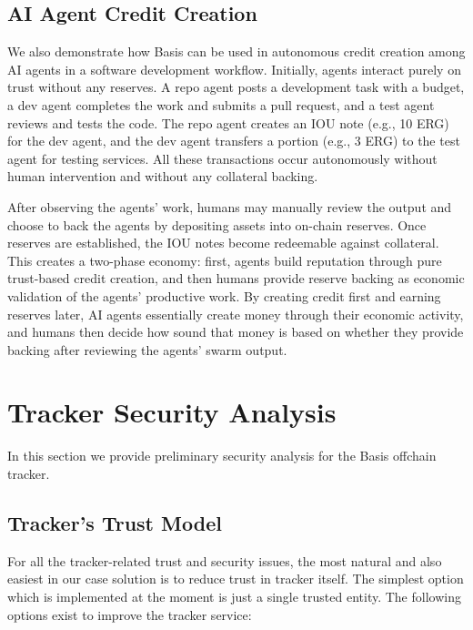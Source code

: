 \documentclass{ifcolog}
\newcommand{\basis}{Basis}
\begin{document}
\subsection{AI Agent Credit Creation}

We also demonstrate how \basis{} can be used in autonomous credit creation among AI agents in a software development workflow. Initially, agents interact purely on trust without any reserves. A repo agent posts a development task with a budget, a dev agent completes the work and submits a pull request, and a test agent reviews and tests the code. The repo agent creates an IOU note (e.g., 10 ERG) for the dev agent, and the dev agent transfers a portion (e.g., 3 ERG) to the test agent for testing services. All these transactions occur autonomously without human intervention and without any collateral backing.

After observing the agents' work, humans may manually review the output and choose to back the agents by depositing assets into on-chain reserves. Once reserves are established, the IOU notes become redeemable against collateral. This creates a two-phase economy: first, agents build reputation through pure trust-based credit creation, and then humans provide reserve backing as economic validation of the agents' productive work. By creating credit first and earning reserves later, AI agents essentially create money through their economic activity, and humans then decide how sound that money is based on whether they provide backing after reviewing the agents' swarm output.


\section{Tracker Security Analysis}
\label{sec-security}

In this section we provide preliminary security analysis for the \basis{} offchain tracker.

\subsection{Tracker's Trust Model}

For all the tracker-related trust and security issues, the most natural and also easiest in our case solution
is to reduce trust in tracker itself. The simplest option which is implemented at the moment is just a single trusted entity.
The following options exist to improve the tracker service:
\end{document}
